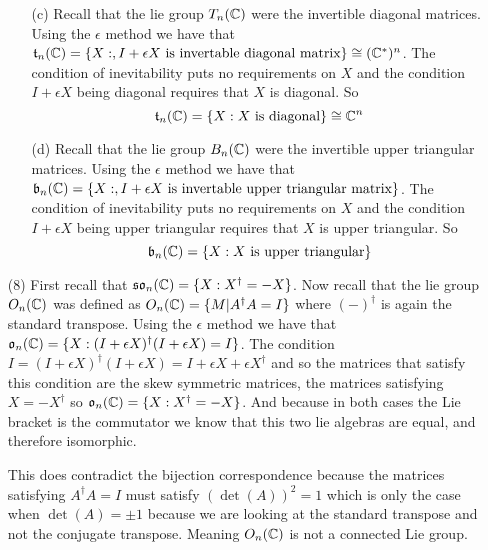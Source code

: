 \documentclass[12pt]{amsart}
\begin{document}
\begin{itemize}
\begin{itemize}
        \item[(c)] Recall that the lie group $T_n(\mathbb{C})$ were the invertible diagonal matrices.
        Using the $\epsilon$ method we have that 
        $\mathfrak{t}_n(\mathbb{C})=\{X:, I+\epsilon X\text{ is invertable diagonal matrix}\}\cong (\mathbb{C}^*)^n$.
        The condition of inevitability puts no requirements on $X$ and 
        the condition $I+\epsilon X$ being diagonal requires that $X$ is diagonal. 
        So \[\mathfrak{t}_n(\mathbb{C})=\{X: X\text{ is diagonal}\}\cong \mathbb{C}^n\]
        

        \item[(d)] Recall that the lie group $B_n(\mathbb{C})$ were the invertible upper 
        triangular matrices.
        Using the $\epsilon$ method we have that 
        $\mathfrak{b}_n(\mathbb{C})=\{X:, I+\epsilon X\text{ is invertable upper triangular matrix}\}$.
        The condition of inevitability puts no requirements on $X$ and 
        the condition $I+\epsilon X$ being upper triangular requires that $X$ is upper triangular. 
        So \[\mathfrak{b}_n(\mathbb{C})=\{X: X\text{ is upper triangular}\}\]
    \end{itemize}

    \item[(8)] %
    First recall that $\mathfrak{so}_n(\mathbb{C})=\{X: X^\dagger = -X\}$.
    Now recall that the lie group $O_n(\mathbb{C})$ was defined as 
        $O_n(\mathbb{C})=\{M| A^\dagger A=I\}$ where $(-)^\dagger$ 
        is again the standard transpose.
        Using the $\epsilon$ method we have that 
        $\mathfrak{o}_n(\mathbb{C})=\{X:(I+\epsilon X)^\dagger (I+\epsilon X)=I\}$.
        The condition $I=(I+\epsilon X)^\dagger (I+\epsilon X)=I+\epsilon X+\epsilon X^\dagger$ and 
        so the matrices that satisfy this condition are the skew symmetric matrices, the matrices 
        satisfying $X=-X^\dagger$ so $\mathfrak{o}_n(\mathbb{C})=\{X: X^\dagger = -X\}$. And because in both cases
        the Lie bracket is the commutator we know that this two lie algebras are equal, and therefore isomorphic.

        This does contradict the bijection correspondence because the matrices satisfying $A^\dagger A=I$ 
        must satisfy $(\det(A))^2=1$ which is only the case when $\det(A)=\pm 1$ because we are looking at the standard
        transpose and not the conjugate transpose. Meaning $O_n(\mathbb{C})$ is not a connected Lie group.
\end{itemize}
\end{document}
